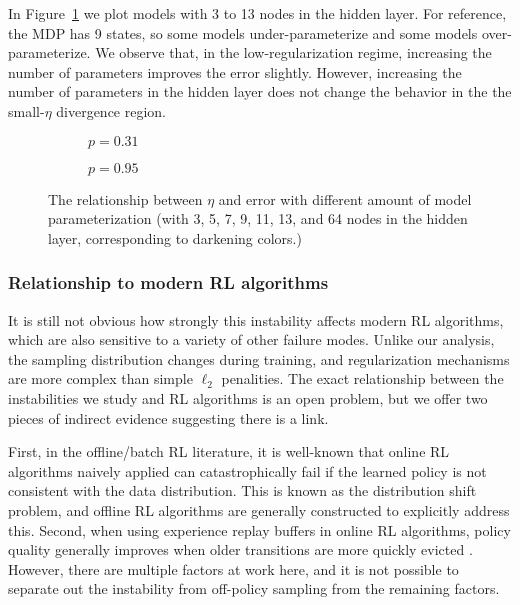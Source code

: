 In Figure~\ref{fig:twomultilayerperfs_k} we plot models with 3 to 13 nodes in the hidden layer. For reference, the MDP has 9 states, so some models under-parameterize and some models over-parameterize. We observe that, in the low-regularization regime, increasing the number of parameters improves the error slightly. However, increasing the number of parameters in the hidden layer does not change the behavior in the the small-$\eta$ divergence region.

\begin{figure}[b]
  \begin{subfigure}[t]{0.48\textwidth}
    \centering
    
    \caption{$p=0.31$}
  \end{subfigure}
  \hfill
  \begin{subfigure}[t]{0.48\textwidth}
    \centering
    
    \caption{$p=0.95$}
  \end{subfigure}
  \caption{The relationship between $\eta$ and error with different amount of model parameterization (with 3, 5, 7, 9, 11, 13, and 64 nodes in the hidden layer, corresponding to darkening colors.) }
  \label{fig:twomultilayerperfs_k}
\end{figure}

\subsubsection{Relationship to modern RL algorithms}

It is still not obvious how strongly this instability affects modern RL algorithms, which are also sensitive to a variety of other failure modes. Unlike our analysis, the sampling distribution changes during training, and regularization mechanisms are more complex than simple $\ell_2$ penalities. The exact relationship between the instabilities we study and RL algorithms is an open problem, but we offer two pieces of indirect evidence suggesting there is a link.

First, in the offline/batch RL literature, it is well-known that online RL algorithms naively applied can catastrophically fail if the learned policy is not consistent with the data distribution. This is known as the distribution shift problem, \cite[p.~26]{levine2020offline} and offline RL algorithms are generally constructed to explicitly address this. Second, when using experience replay buffers in online RL algorithms, policy quality generally improves when older transitions are more quickly evicted \cite{fedus2020revisiting}. However, there are multiple factors at work here, and it is not possible to separate out the instability from off-policy sampling from the remaining factors.

